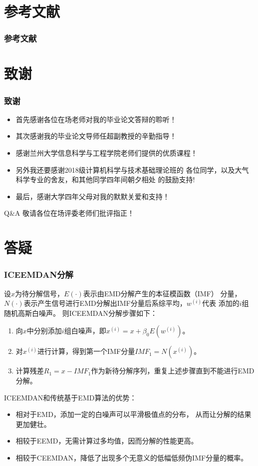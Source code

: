 \documentclass[14pt, AutoFakeBold]{ppt}
\begin{document}
\section{参考文献}
\begin{frame}[t]
  \frametitle{参考文献}
  
  
  
\end{frame}

\section{致谢}

\begin{frame}
\frametitle{致谢}
  \begin{itemize}
  \item 首先感谢各位在场老师对我的毕业论文答辩的聆听！
  \item 其次感谢我的毕业论文导师任超副教授的辛勤指导！
  \item 感谢兰州大学信息科学与工程学院老师们提供的优质课程！
  \item 另外我还要感谢2018级计算机科学与技术基础理论班的
  各位同学，以及大气科学专业的舍友，和其他同学四年间朝夕相处
  的鼓励支持!
  \item 最后，感谢大学四年父母对我的默默关爱和支持！
  \end{itemize}
  \rightline{}
  \begin{block}{Q\&A}
    敬请各位在场评委老师们批评指正！
  \end{block}
\end{frame}

\section{答疑}
\begin{frame}
  \frametitle{ICEEMDAN分解}
  设$x$为待分解信号，$E(·)$表示由EMD分解产生的本征模函数（IMF）
  分量，$N(·)$表示产生信号进行EMD分解出IMF分量后系综平均，$w^{(i)}$代表
  添加的$i$组随机高斯白噪声。
  则ICEEMDAN分解步骤如下：
  \begin{enumerate}
    \item 向$x$中分别添加$i$组白噪声，即$x^{(i)}=x+\beta_0E(w^{(i)})$。
    \item 对$x^{(i)}$进行计算，得到第一个IMF分量$IMF_1=N(x^{(i)})$。
    \item 计算残差$R_1=x-IMF_1$作为新待分解序列，重复上述步骤直到不能进行EMD分解。
  \end{enumerate}
  ICEEMDAN和传统基于EMD算法的优势：
  \begin{itemize}
    \item 相对于EMD，添加一定的白噪声可以平滑极值点的分布，
    从而让分解的结果更加健壮。
    \item 相较于EEMD，无需计算过多均值，因而分解的性能更高。
    \item 相较于CEEMDAN，降低了出现多个无意义的低幅低频伪IMF分量的概率。
  \end{itemize}
\end{frame}
\end{document}
